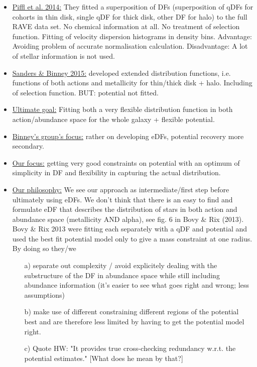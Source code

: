 \begin{itemize}
\item \underline{Piffl et al. 2014:} They fitted a superposition of DFs (superposition of qDFs for cohorts in thin disk, single qDF for thick disk, other DF for halo) to the full RAVE data set. No chemical information at all. No treatment of selection function. Fitting of velocity dispersion histograms in density bins. Advantage: Avoiding problem of accurate normalisation calculation. Disadvantage: A lot of stellar information is not used.
\item  \underline{Sanders \& Binney 2015:} developed extended distribution functions, i.e. functions of both actions and metallicity for thin/thick disk + halo. Including of selection function. BUT: potential not fitted.
\item \underline{Ultimate goal:} Fitting both a very flexible distribution function in both action/abundance space for the whole galaxy + flexible potential.
\item \underline{Binney's group's focus:} rather on developing eDFs, potential recovery more secondary.
\item \underline{Our focus:} getting very good constraints on potential with an optimum of simplicity in DF and flexibility in capturing the actual distribution. 
\item \underline{Our philosophy:} We see our approach as intermediate/first step before ultimately using eDFs. We don't think that there is an easy to find and formulate eDF that describes the distribution of stars in both action and abundance space (metallicity AND alpha), see fig. 6 in Bovy \& Rix (2013). Bovy \& Rix 2013 were fitting each \MAP separately with a qDF and potential and used the best fit potential model only to give a mass constraint at one radius. By doing so they/we 
\begin{itemize}
\item[a)] separate out complexity / avoid explicitely dealing with the substructure of the DF in abundance space while still including abundance information (it's easier to see what goes right and wrong; less assumptions) 
\item[b)] make use of different \MAPs constraining different regions of the potential best and are therefore less limited by having to get the potential model right.
\item[c)] Quote HW: "It provides true cross-checking redundancy w.r.t. the potential estimates." [What does he mean by that?]
\end{itemize}
\end{itemize}


